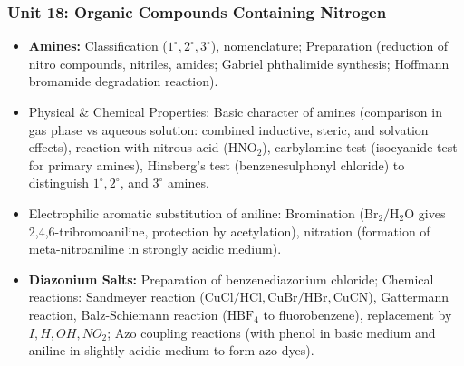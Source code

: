 \documentclass[11pt,a4paper]{article}
\begin{document}
\subsubsection{Unit 18: Organic Compounds Containing Nitrogen}
\begin{itemize}
  \item \textbf{Amines:} Classification ($1^\circ, 2^\circ, 3^\circ$), nomenclature; Preparation (reduction of nitro compounds, nitriles, amides; Gabriel phthalimide synthesis; Hoffmann bromamide degradation reaction).
  \item Physical \& Chemical Properties: Basic character of amines (comparison in gas phase vs aqueous solution: combined inductive, steric, and solvation effects), reaction with nitrous acid ($\text{HNO}_2$), carbylamine test (isocyanide test for primary amines), Hinsberg's test (benzenesulphonyl chloride) to distinguish $1^\circ, 2^\circ$, and $3^\circ$ amines.
  \item Electrophilic aromatic substitution of aniline: Bromination ($\text{Br}_2/\text{H}_2\text{O}$ gives 2,4,6-tribromoaniline, protection by acetylation), nitration (formation of meta-nitroaniline in strongly acidic medium).
  \item \textbf{Diazonium Salts:} Preparation of benzenediazonium chloride; Chemical reactions: Sandmeyer reaction ($\text{CuCl}/\text{HCl}, \text{CuBr}/\text{HBr}, \text{CuCN}$), Gattermann reaction, Balz-Schiemann reaction ($\text{HBF}_4$ to fluorobenzene), replacement by $I, H, OH, NO_2$; Azo coupling reactions (with phenol in basic medium and aniline in slightly acidic medium to form azo dyes).
\end{itemize}
\end{document}
